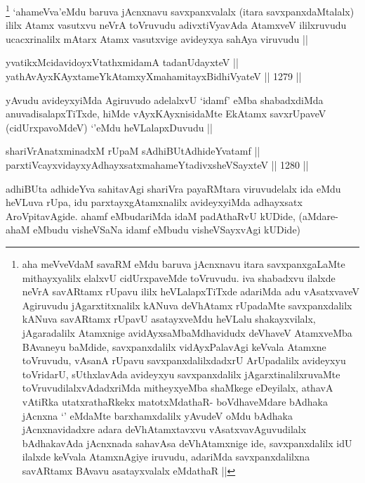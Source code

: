 \begin{artha}
\footnote{aha meVveVdaM savaRM eMdu baruva jAcnxnavu itara savxpanxgaLaMte mithayxyalilx elalxvU cidUrxpaveMde toVruvudu. iva shabadxvu ilalxde neVrA savARtamx rUpavu ililx heVLalapxTiTxde adariMda adu vAsatxvaveV Agiruvudu jAgarxtitxnalilx kANuva deVhAtamx rUpadaMte savxpanxdalilx kANuva savARtamx rUpavU asatayxveMdu heVLalu shakayxvilalx, jAgaradalilx Atamxnige avidAyxsaMbaMdhavidudx deVhaveV AtamxveMba BAvaneyu baMdide, savxpanxdalilx vidAyxPalavAgi keVvala Atamxne toVruvudu, vAsanA rUpavu savxpanxdalilxdadxrU ArUpadalilx avideyxyu toVridarU, sUthxlavAda avideyxyu savxpanxdalilx jAgarxtinalilxruvaMte toVruvudilalxvAdadxriMda mitheyxyeMba shaMkege eDeyilalx, athavA vAtiRka utatxrathaRkekx matotxMdathaR- boVdhaveMdare bAdhaka jAcnxna `\stext' eMdaMte barxhamxdalilx yAvudeV oMdu bAdhaka jAcnxnavidadxre adara deVhAtamxtavxvu vAsatxvavAguvudilalx bAdhakavAda jAcnxnada sahavAsa deVhAtamxnige ide, savxpanxdalilx idU ilalxde keVvala AtamxnAgiye iruvudu, adariMda savxpanxdalilxna savARtamx BAvavu asatayxvalalx eMdathaR ||} `ahameVva'eMdu baruva jAcnxnavu savxpanxvalalx (itara savxpanxdaMtalalx) ililx Atamx vasutxvu neVrA toVruvudu adivxtiVyavAda AtamxveV ililxruvudu ucacxrinalilx mAtarx Atamx vasutxvige avideyxya sahAya viruvudu ||
\end{artha}


\begin{shl}
yvatikxMcidavidoyxVtathxmidamA tadanUdayxteV || \\
yathAvAyxKAyxtameYkAtamxyXmahamitayxBidhiVyateV ||  1279 ||  
\end{shl}

\begin{artha}
yAvudu avideyxyiMda Agiruvudo adelalxvU `idamf' eMba shabadxdiMda anuvadisalapxTiTxde, hiMde vAyxKAyxnisidaMte EkAtamx savxrUpaveV (cidUrxpavoMdeV) `\stext'eMdu heVLalapxDuvudu ||
\end{artha}


\begin{shl}
shariVrAnatxminadxM rUpaM sAdhiBUtAdhideYvatamf || \\
parxtiVcayxvidayxyA\s dhayxsatxmahameYtadivxsheVSayxteV ||  1280 ||  
\end{shl}

\begin{artha}
adhiBUta adhideYva sahitavAgi shariVra payaRMtara viruvudelalx ida eMdu heVLuva rUpa, idu parxtayxgAtamxnalilx avideyxyiMda adhayxsatx AroVpitavAgide. ahamf eMbudariMda idaM padAthaRvU kUDide, (aMdare-ahaM eMbudu visheVSaNa idamf eMbudu visheVSayxvAgi kUDide)
\end{artha}

